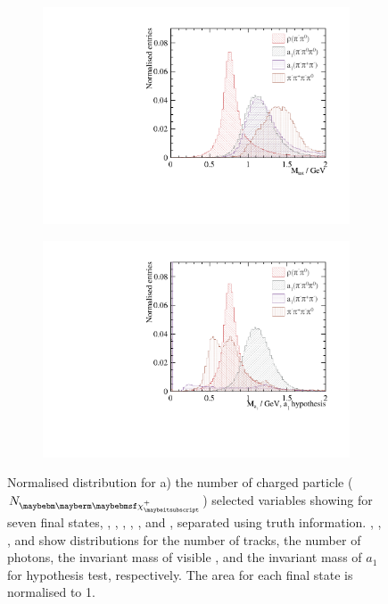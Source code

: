 \begin{figure}[htbp]
\begin{subfigure}[b]{0.45\textwidth}
 \includegraphics[width=\textwidth]{tau/var2/mVis_100GeV_improved_zoom.pdf}
  \caption{}
  \label{fig:tauVarMVis}
\end{subfigure}
\begin{subfigure}[b]{0.45\textwidth}
 \includegraphics[width=\textwidth]{tau/var2/mA1A1Fit_100GeV_improved_zoom.pdf}
  \caption{}
  \label{fig:tauVarMA1}
\end{subfigure}

\caption
{Normalised distribution for a) the number of charged particle (${N}_{\charge}$)
 selected variables showing for seven final states, \decayElectronShort, \decayMuonShort, \decayPionShort, \decayRhoShort, \decayAiPhotonShort, \decayAiPionShort and \decayThreePionPhotonShort, separated using truth information. , , , and  show distributions for the number of tracks, the number of photons, the invariant mass of visible \PFOs, and the invariant mass of $a_1$ for \decayAiPhotonShort hypothesis test, respectively. The area for each final state is normalised to 1.
}
\label{fig:tauVar}
\end{figure}

